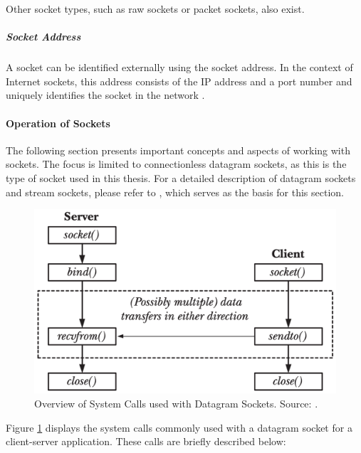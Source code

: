 Other socket types, such as raw sockets or packet sockets, also exist.


\subparagraph{Socket Address}
A socket can be identified externally using the socket address. In the context of Internet sockets, this address consists of the IP address and a port number and uniquely identifies the socket in the network \cite{sock02}.


\paragraph{Operation of Sockets}

The following section presents important concepts and aspects of working with sockets. The focus is limited to connectionless datagram sockets, as this is the type of socket used in this thesis. For a detailed description of datagram sockets and stream sockets, please refer to \cite{like03}, which serves as the basis for this section.

\begin{figure}[h]
    \centering
    \includegraphics[width=0.75\linewidth]{figures/linux_nwstack/image01.png}
    \caption[Overview of System Calls used with Datagram Sockets]{Overview of System Calls used with Datagram Sockets. Source: \cite{like03}.}
    \label{fig:SocketOperations}
\end{figure}

Figure \ref{fig:SocketOperations} displays the system calls commonly used with a datagram socket for a client-server application. These calls are briefly described below:

